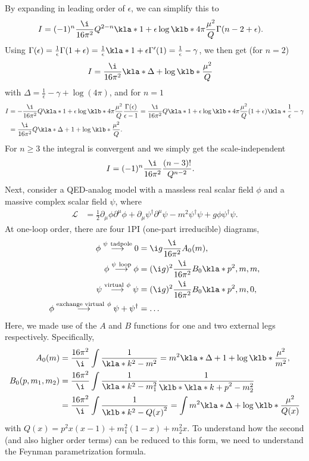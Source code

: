 \documentclass[english, parskip=full]{scrbook}
\begin{document}
By expanding in leading order of $\epsilon$, we can simplify this to
\begin{align}
I &= (-1)^n \frac{\i}{16\pi^2} Q^{2-n} \kla*{1 + \epsilon\log\klb*{4\pi \frac{\mu^2}{Q}}} \Gamma(n-2+\epsilon).
\end{align}
Using $\Gamma(\epsilon)=\frac{1}{\epsilon}\Gamma(1+\epsilon)=\frac{1}{\epsilon}\kla*{1 + \epsilon\Gamma'(1)} = \frac{1}{\epsilon}-\gamma$, we then get (for $n=2$)
\begin{align}
I &= \frac{\i}{16\pi^2} \kla*{\Delta + \log\klb*{\frac{\mu^2}{Q}}}
\end{align}
with $\Delta = \frac{1}{\epsilon}-\gamma + \log(4\pi)$, and for $n=1$
\begin{align}
I &= -\frac{\i}{16\pi^2} Q \kla*{1 + \epsilon\log\klb*{4\pi\frac{\mu^2}{Q}}}\frac{\Gamma(\epsilon)}{\epsilon-1} = \frac{\i}{16\pi^2} Q \kla*{1 + \epsilon\log\klb*{4\pi\frac{\mu^2}{Q}}} (1+\epsilon) \kla*{\frac{1}{\epsilon} - \gamma}\\
&= \frac{\i}{16\pi^2} Q \kla*{\Delta+1 + \log\klb*{\frac{\mu^2}{Q}}}.
\end{align}
For $n\ge 3$ the integral is convergent and we simply get the scale-independent
\begin{align}
I &= (-1)^n \frac{\i}{16\pi^2} \frac{(n-3)!}{Q^{n-2}}.
\end{align}
Next, consider a QED-analog model with a massless real scalar field $\phi$ and a massive complex scalar field $\psi$, where
\begin{align}
\mathcal{L} &= \frac{1}{2}\partial_\mu\phi\partial^\mu\phi + \partial_\mu\psi^\dagger \partial^\mu\psi - m^2\psi^\dagger \psi + g\phi\psi^\dagger\psi.
\end{align}
At one-loop order, there are four 1PI (one-part irreducible) diagrams,
\begin{align}
\phi \overset{\psi\ \mathrm{tadpole}}{\longrightarrow} 0 &= \i g \frac{\i}{16\pi^2} A_0(m),\\
\phi \overset{\psi\ \mathrm{loop}}{\longrightarrow} \phi &= (\i g)^2 \frac{\i}{16\pi^2} B_0\kla*{p^2,m,m},\\
\psi \overset{\mathrm{virtual}\ \phi}{\longrightarrow} \psi &= (\i g)^2 \frac{\i}{16\pi^2} B_0\kla*{p^2,m,0},\\
\phi \overset{\text{exchange virtual}\ \phi}{\longrightarrow} \psi + \psi^\dagger &= \dots
\end{align}
Here, we made use of the $A$ and $B$ functions for one and two external legs respectively.
Specifically,
\begin{align}
A_0(m) &= \frac{16\pi^2}{\i} \int \frac{1}{\kla*{k^2-m^2}} = m^2 \kla*{\Delta+1 + \log\klb*{\frac{\mu^2}{m^2}}},\\
B_0(p,m_1,m_2) &= \frac{16\pi^2}{\i} \int \frac{1}{\kla*{k^2-m_1^2}} \frac{1}{\klb*{\kla*{k+p}^2-m_2^2}} \\
&= \frac{16\pi^2}{\i} \int \frac{1}{\klb*{k^2-Q(x)}^2} = \int m^2\kla*{\Delta + \log\klb*{\frac{\mu^2}{Q(x)}}}
\end{align}
with $Q(x)=p^2x(x-1)+m_1^2(1-x)+m_2^2x$.
To understand how the second (and also higher order terms) can be reduced to this form, we need to understand the Feynman parametrization formula.
\end{document}
